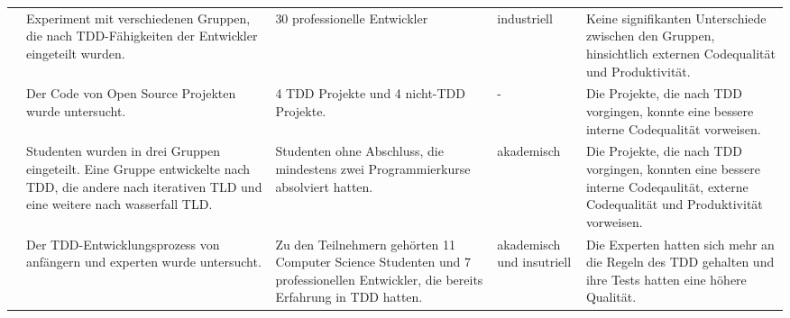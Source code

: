 \begin{table*}[t]
\begin{tabularx}{\textwidth}{@{}Xp{}p{}p{}p{}@{}}
\cite{Fucci2015TowardsStudy}                 & Experiment mit verschiedenen Gruppen, die nach TDD-Fähigkeiten der Entwickler eingeteilt wurden.                                                                                                                                         & 30 professionelle Entwickler                                                                                                                                   & industriell               & Keine signifikanten Unterschiede zwischen den Gruppen, hinsichtlich externen Codequalität und Produktivität.                                                                                                                                                    \\
\cite{Hilton2009QuantitativelyProjects}      & Der Code von Open Source Projekten wurde untersucht.                                                                                                                                                                                     & 4 TDD Projekte und 4 nicht-TDD Projekte.                                                                                                                       & -                         & Die Projekte, die nach TDD vorgingen, konnte eine bessere interne Codequalität vorweisen.                                                                                                                                                                       \\
\cite{Janzen2006OnDesign}                    & Studenten wurden in drei Gruppen eingeteilt. Eine Gruppe entwickelte nach TDD, die andere nach iterativen TLD und eine weitere nach wasserfall TLD.                                                                                      & Studenten ohne Abschluss, die mindestens zwei Programmierkurse absolviert hatten.                                                                              & akademisch                & Die Projekte, die nach TDD vorgingen, konnten eine bessere interne Codeqaulität, externe Codequalität und Produktivität vorweisen.                                                                                                                              \\
\cite{Muller2007TheProcess}                  & Der TDD-Entwicklungsprozess von anfängern und experten wurde untersucht.                                                                                                                                                                 & Zu den Teilnehmern gehörten 11 Computer Science Studenten und 7 professionellen Entwickler, die bereits Erfahrung in TDD hatten.                               & akademisch und insutriell & Die Experten hatten sich mehr an die Regeln des TDD gehalten und ihre Tests hatten eine höhere Qualität.                                                                                                                                                        \\

\end{tabularx}
\end{table*}

